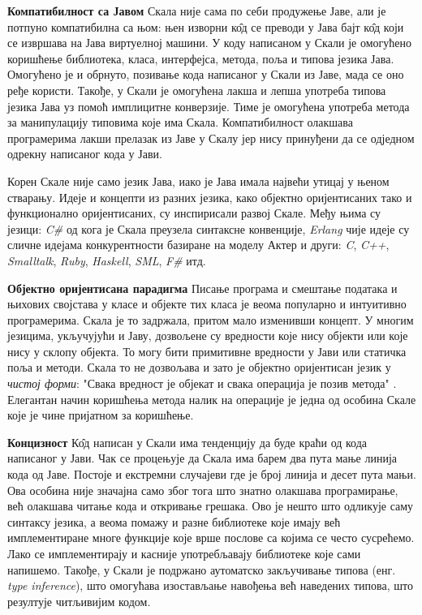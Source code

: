 \documentclass[12pt,oneside]{memoir}
\begin{document}
\begin{description}
\item \textbf{Компатибилност са Јавом} Скала није сама по себи продужење Јаве, али је потпуно компатибилна са њом: њен изворни к\^{о}д се преводи у Јава бајт к\^{о}д који се извршава на Јава виртуелној машини. У коду написаном у Скали је омогућено коришћење библиотека, класа, интерфејса, метода, поља и типова језика Јава. Омогућено је и обрнуто, позивање кода написаног у Скали из Јаве, мада се оно ређе користи. Такође, у Скали је омогућена лакша и лепша употреба типова језика Јава уз помоћ имплицитне конверзије. Тиме је омогућена употреба метода за манипулацију типовима које има Скала. Компатибилност олакшава програмерима лакши прелазак из Јаве у Скалу јер нису принуђени да се одједном одрекну написаног кода у Јави.

Корен Скале није само језик Јава, иако је Јава имала највећи утицај у њеном стварању. Идеје и концепти из разних језика, како објектно оријентисаних тако и функционално оријентисаних, су инспирисали развој Скале. Међу њима су језици: \textit{C\#}  од кога је Скала преузела синтаксне конвенције, \textit{Erlang} чије идеје су сличне идејама конкурентности базиране на моделу Актер и други: \textit{C}, \textit{C++},  \textit{Smalltalk}, \textit{Ruby}, \textit{Haskell}, \textit{SML}, \textit{F\#} итд.

\item \textbf{Објектно оријентисана парадигма} Писање програма и смештање података и њихових својстава у класе и објекте тих класа је веома популарно и интуитивно програмерима. Скала је то задржала, притом мало изменивши концепт. У многим језицима, укључујући и Јаву, дозвољене су вредности које нису објекти или које нису у склопу објекта. То могу бити примитивне вредности у Јави или статичка поља и методи. Скала то не дозвољава и зато је објектно оријентисан језик у \textit{чистој форми}: "Свака вредност је објекат и свака операција је позив метода" \cite{progInScala}. Елегантан начин коришћења метода налик на операције је једна од особина Скале које је чине пријатном за коришћење.

\item \textbf{Концизност} К\^{о}д написан у Скали има тенденцију да буде краћи од кода написаног у Јави. Чак се процењује да Скала има барем два пута мање линија кода од Јаве. Постоје и екстремни случајеви где је број линија и десет пута мањи. Ова особина није значајна само због тога што знатно олакшава програмирање, већ олакшава читање кода и откривање грешака. Ово је нешто што одликује саму синтаксу језика, а веома помажу и разне библиотеке које имају већ имплементиране многе функције које врше послове са којима се често сусрећемо. Лако се имплементирају и касније употребљавају библиотеке које сами напишемо. Такође, у Скали је подржано аутоматско закључивање типова (енг. \textit{type inference}), што омогућава изостављање навођења већ наведених типова, што резултује читљивијим кодом.


\end{description}
\end{document}
